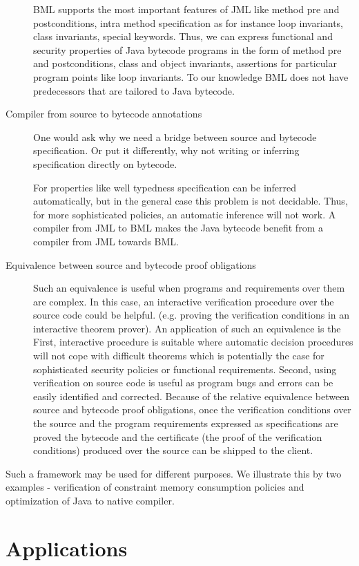 \begin{description}
 

	 BML supports the most important features of JML like method pre and postconditions, intra method specification as for instance loop invariants, class invariants, special
	 keywords. Thus, we can express functional and security properties of Java
	 bytecode programs in the form of method pre and postconditions, class and object invariants, assertions
	 for particular program points like loop invariants. To our knowledge BML does not have predecessors that are tailored 
	 to Java bytecode.  

   \item [Compiler from source to bytecode annotations]
         One would ask why we need a bridge between source and bytecode specification. Or put it differently, why not
	 writing or inferring specification directly on bytecode.
 
	 For properties like well typedness specification can be inferred automatically,
	 but in the general case this problem is not decidable.  
	 Thus, for more sophisticated policies, an automatic inference will not work.
	 A compiler from JML to BML  makes the Java  bytecode benefit from
	 a compiler from JML  towards BML.

    \item[Equivalence between source and bytecode proof obligations] Such an equivalence is useful when programs and requirements over them are complex.
         In this case, an interactive verification procedure over the source code  could be helpful.
	 (e.g. proving the verification conditions in an interactive theorem prover).
	 An application of such an equivalence is the 
	 First, interactive  procedure is suitable where automatic decision procedures will not cope with
	 difficult theorems which is potentially the case for sophisticated security policies or functional requirements. 
	 Second, using verification on source code is useful as program bugs and errors can be easily identified and corrected.
	 Because of the relative equivalence between source and bytecode proof obligations, 
	 once the verification conditions over the source and the program requirements expressed as specifications are
	 proved the bytecode and the certificate (the proof of the verification conditions) produced over the source
	 can be shipped  to the client.
\end{description}

Such a framework may be used for different purposes. We illustrate this by two examples - verification of constraint memory consumption policies and
    optimization of Java to native compiler.




\section{Applications}



